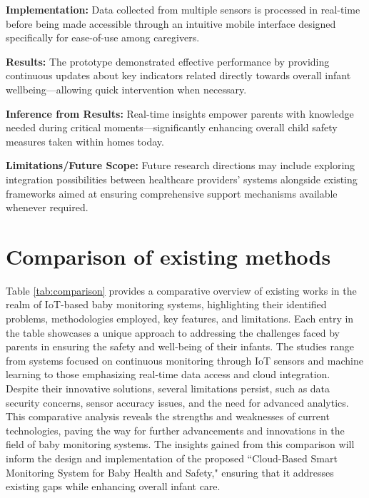 \documentclass[12pt,a4paper]{report}
\begin{document}
\setlength{\parskip}{1em}  %


\noindent\textbf{Implementation:} Data collected from multiple sensors is processed in real-time before being made accessible through an intuitive mobile interface designed specifically for ease-of-use among caregivers.
\setlength{\parskip}{1em}  %

\noindent\textbf{Results:} The prototype demonstrated effective performance by providing continuous updates about key indicators related directly towards overall infant wellbeing—allowing quick intervention when necessary.

\setlength{\parskip}{1em}  %


\noindent\textbf{Inference from Results:} Real-time insights empower parents with knowledge needed during critical moments—significantly enhancing overall child safety measures taken within homes today.


\setlength{\parskip}{1em}  %

\noindent\textbf{Limitations/Future Scope:} Future research directions may include exploring integration possibilities between healthcare providers’ systems alongside existing frameworks aimed at ensuring comprehensive support mechanisms available whenever required.
\setlength{\parskip}{1em}  %

\section{Comparison of existing methods}
Table \ref{tab:comparison} provides a comparative overview of existing works in the realm of IoT-based baby monitoring systems, highlighting their identified problems, methodologies employed, key features, and limitations. Each entry in the table showcases a unique approach to addressing the challenges faced by parents in ensuring the safety and well-being of their infants. The studies range from systems focused on continuous monitoring through IoT sensors and machine learning to those emphasizing real-time data access and cloud integration. Despite their innovative solutions, several limitations persist, such as data security concerns, sensor accuracy issues, and the need for advanced analytics. This comparative analysis reveals the strengths and weaknesses of current technologies, paving the way for further advancements and innovations in the field of baby monitoring systems. The insights gained from this comparison will inform the design and implementation of the proposed ``Cloud-Based Smart Monitoring System for Baby Health and Safety," ensuring that it addresses existing gaps while enhancing overall infant care.
\end{document}
